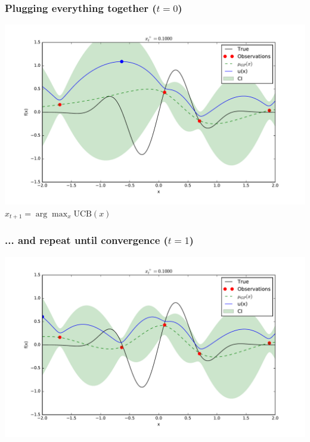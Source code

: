 \documentclass{beamer}
\begin{document}
\begin{frame}
    \frametitle{Plugging everything together ($t=0$)}
    \begin{center}
        \includegraphics[width=\textwidth]{code/fig4-0.pdf}\\
        $x_{t+1} = \arg \max_{x} \text{UCB}(x)$
    \end{center}
\end{frame}

\begin{frame}
    \frametitle{... and repeat until convergence ($t=1$)}
    \begin{center}
        \includegraphics[width=\textwidth]{code/fig4-1.pdf}
    \end{center}
\end{frame}
\end{document}

